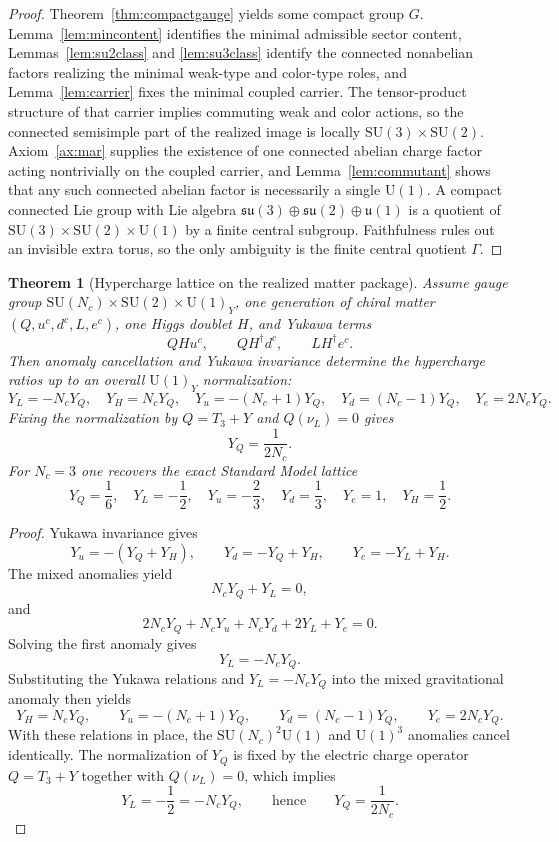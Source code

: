 \documentclass[11pt]{article}
\newtheorem{theorem}{Theorem}[section]
\newcommand{\SU}{\mathrm{SU}}
\newcommand{\U}{\mathrm{U}}
\begin{document}
\begin{proof}
Theorem~\ref{thm:compactgauge} yields some compact group $G$. Lemma~\ref{lem:mincontent} identifies the minimal admissible sector content, Lemmas~\ref{lem:su2class} and \ref{lem:su3class} identify the connected nonabelian factors realizing the minimal weak-type and color-type roles, and Lemma~\ref{lem:carrier} fixes the minimal coupled carrier. The tensor-product structure of that carrier implies commuting weak and color actions, so the connected semisimple part of the realized image is locally $\SU(3)\times\SU(2)$. Axiom~\ref{ax:mar} supplies the existence of one connected abelian charge factor acting nontrivially on the coupled carrier, and Lemma~\ref{lem:commutant} shows that any such connected abelian factor is necessarily a single $\U(1)$. A compact connected Lie group with Lie algebra $\mathfrak{su}(3)\oplus\mathfrak{su}(2)\oplus\mathfrak{u}(1)$ is a quotient of $\SU(3)\times\SU(2)\times\U(1)$ by a finite central subgroup. Faithfulness rules out an invisible extra torus, so the only ambiguity is the finite central quotient $\Gamma$.
\end{proof}

\begin{theorem}[Hypercharge lattice on the realized matter package]\label{thm:hypercharge}
Assume gauge group $\SU(N_c)\times\SU(2)\times\U(1)_Y$, one generation of chiral matter $(Q,u^c,d^c,L,e^c)$, one Higgs doublet $H$, and Yukawa terms
\[
QHu^c,\qquad QH^\dagger d^c,\qquad LH^\dagger e^c.
\]
Then anomaly cancellation and Yukawa invariance determine the hypercharge ratios up to an overall \(\U(1)_Y\) normalization:
\[
Y_L=-N_cY_Q,\quad
Y_H=N_cY_Q,\quad
Y_u=-(N_c+1)Y_Q,\quad
Y_d=(N_c-1)Y_Q,\quad
Y_e=2N_cY_Q.
\]
Fixing the normalization by $Q=T_3+Y$ and $Q(\nu_L)=0$ gives
\[
Y_Q=\frac{1}{2N_c}.
\]
For $N_c=3$ one recovers the exact Standard Model lattice
\[
Y_Q=\frac16,\quad
Y_L=-\frac12,\quad
Y_u=-\frac23,\quad
Y_d=\frac13,\quad
Y_e=1,\quad
Y_H=\frac12.
\]
\end{theorem}

\begin{proof}
Yukawa invariance gives
\[
Y_u=-(Y_Q+Y_H),\qquad
Y_d=-Y_Q+Y_H,\qquad
Y_e=-Y_L+Y_H.
\]
The mixed anomalies yield
\[
N_cY_Q+Y_L=0,
\]
and
\[
2N_cY_Q+N_cY_u+N_cY_d+2Y_L+Y_e=0.
\]
Solving the first anomaly gives
\[
Y_L=-N_cY_Q.
\]
Substituting the Yukawa relations and $Y_L=-N_cY_Q$ into the mixed gravitational anomaly then yields
\[
Y_H=N_cY_Q,\qquad
Y_u=-(N_c+1)Y_Q,\qquad
Y_d=(N_c-1)Y_Q,\qquad
Y_e=2N_cY_Q.
\]
With these relations in place, the $\SU(N_c)^2\U(1)$ and $\U(1)^3$ anomalies cancel identically. The normalization of $Y_Q$ is fixed by the electric charge operator $Q=T_3+Y$ together with $Q(\nu_L)=0$, which implies
\[
Y_L=-\frac12=-N_cY_Q,
\qquad\text{hence}\qquad
Y_Q=\frac{1}{2N_c}.
\]
\end{proof}
\end{document}
